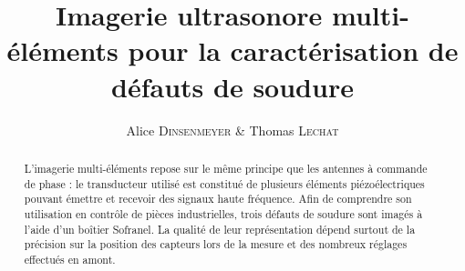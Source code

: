 \documentclass[twoside]{article}
\title{\vspace{-15mm}\fontsize{24pt}{10pt}\selectfont\textbf{Imagerie ultrasonore multi-éléments pour la caractérisation de défauts de soudure}} %
\author{
\large
{Alice \textsc{Dinsenmeyer} \& Thomas \textsc{Lechat}}\\[2mm] %
\vspace{-5mm}
}
\date{}
\begin{document}
\maketitle %

\thispagestyle{fancy} %


\begin{abstract}
\noindent L'imagerie multi-éléments repose sur le même principe que les antennes à commande de phase : le transducteur utilisé est constitué de plusieurs éléments piézoélectriques pouvant émettre et recevoir des signaux haute fréquence.
 Afin de comprendre son utilisation en contrôle de pièces industrielles, trois défauts de soudure sont imagés à l'aide d'un boîtier Sofranel. La qualité de leur représentation dépend surtout de la précision sur la position des capteurs lors de la mesure et des nombreux réglages effectués en amont. 

\end{abstract}

\end{document}

